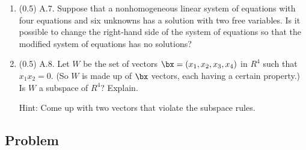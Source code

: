 \documentclass[11pt,titlepage,fleqn]{article}
\begin{document}
\begin{enumerate}
\item (0.5) A.7. Suppose that a nonhomogeneous linear system of equations with four equations and six unknowns has a solution with two free variables. Is it possible to change the right-hand side of the system of equations so that the modified system of equations has no solutions?

\item (0.5) A.8. Let $W$ be the set of vectors $\bx = (x_1,x_2,x_3,x_4)$ in $R^4$ such that $x_1 x_2 = 0$. (So $W$ is made up of $\bx$ vectors, each having a certain property.) Is $W$ a subspace of $R^4$? Explain.

Hint: Come up with two vectors that violate the subspace rules.
\end{enumerate}

\subsection*{Problem} \howmuchtime\




\pagebreak
\vspace{1cm}


\end{document}
